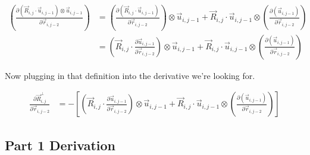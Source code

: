 \documentclass{article}
\renewcommand{\ij}{_{i,j}}
\newcommand{\ijj}{_{i,j-1}}
\newcommand{\ijk}{_{i,j-2}}
\newcommand{\ijjj}{_{i,j-2}}
\renewcommand{\part}[2]{\frac{\partial #1 }{\partial #2}}
\newcommand{\Rij}{\vec{R} \ij}
\newcommand{\rijjj}{\vec{r} \ijjj}
\newcommand{\uijj}{\vec{u} \ijj}
\begin{document}
\begin{align*}
  \left(  
  \part{
  \left(\vec{R}\ij \cdot \vec{u} \ijj \right)\otimes \uijj}{\vec{r}\ijk}  
  \right)
  &= 
  \left(  
  \part{
  \left(\vec{R}\ij \cdot \vec{u} \ijj \right)}{\vec{r}\ijk}  
  \right)\otimes \uijj 
  + 
  \vec{R}\ij \cdot \vec{u} \ijj
  \otimes
  \left(  
  \part{
  ( \uijj  )}{\vec{r}\ijk}  
  \right)
  \\
  &= 
  \left(  
  \Rij \cdot  \part{\uijj}{\rijjj} 
  \right)
  \otimes \uijj 
  + 
  \vec{R}\ij \cdot \vec{u} \ijj
  \otimes
  \left(  
  \part{
  ( \uijj  )}{\vec{r}\ijk}  
  \right)
\end{align*}



Now plugging in that definition into the derivative we're looking for.

\begin{align*}
  \part{\vec{R}\ij ^ \bot}{\vec{r}\ijk}  &=  
  -\left[
  \left(  
  \Rij \cdot  \part{\uijj}{\rijjj} 
  \right)
  \otimes \uijj 
  + 
  \vec{R}\ij \cdot \vec{u} \ijj
  \otimes
  \left(  
  \part{
  ( \uijj  )}{\vec{r}\ijk}  
  \right)
  \right]
\end{align*}

\subsection{Part 1 Derivation}
\end{document}
